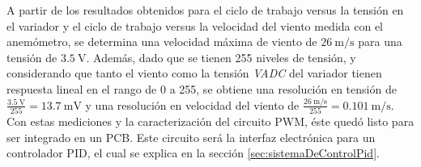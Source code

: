 
A partir de los resultados obtenidos para el ciclo de trabajo versus la tensión en el variador y el ciclo de trabajo versus la velocidad del viento medida con el anemómetro, se determina una velocidad máxima de viento de $\SI{26}{\meter\per\second}$ para una tensión de $\SI{3.5}{\volt}$. Además, dado que se tienen 255 niveles de tensión, y considerando que tanto el viento como la tensión \textit{VADC} del variador tienen respuesta lineal en el rango de 0 a 255, se obtiene una resolución en tensión de $\frac{\SI{3.5}{\volt}}{255} = \SI{13.7}{\milli\volt}$ y una resolución en velocidad del viento de $\frac{\SI{26}{\meter\per\second}}{255} = \SI{0.101}{\meter\per\second}$. Con estas mediciones y la caracterización del circuito PWM, éste quedó listo para ser integrado en un PCB. Este circuito será la interfaz electrónica para un controlador PID, el cual se explica en la sección \ref{sec:sistemaDeControlPid}.


